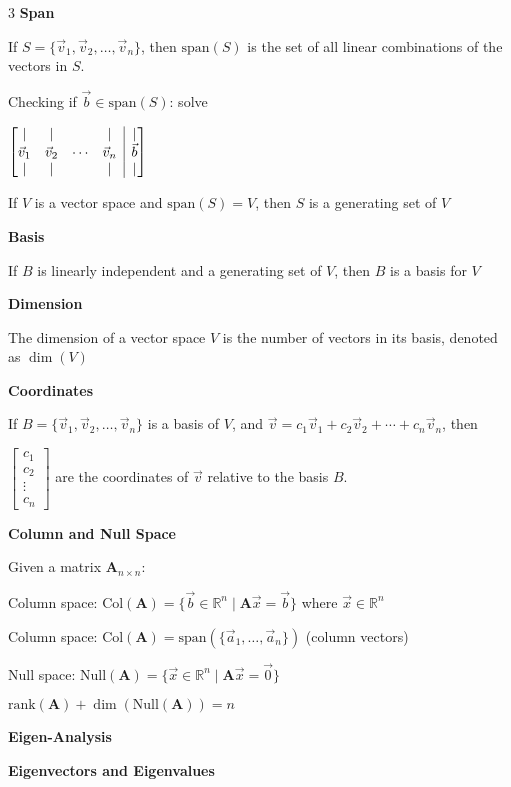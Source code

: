 \documentclass[10pt]{article}
\makeatletter
\newcommand{\R}{{\mathbb R}}
\newcommand{\rank}{\mathrm{rank}}
\newenvironment{amatrix}[1]{\left[\begin{array}{@{}*{#1}{c}|c@{}}}{\end{array}\right]}
\newcommand{\matr}[1]{\mathbf{#1}}
\newcommand\sectionheading[1]{\begin{center}\large{\textbf{#1}}\end{center}\normalsize}
\newcommand\heading[1]{\medskip\textbf{#1}\medskip}
\makeatother
\begin{document}
\begin{multicols*}{3}
\heading{Span}

If $S=\{\vec v_1, \vec v_2, \ldots, \vec v_n\}$, then $\mathrm{span}(S)$ is the set of all linear combinations of the vectors in $S$.

Checking if $\vec b\in\mathrm{span}(S)$: solve 

$\begin{amatrix}{4}
    \vert & \vert & & \vert & \vert \\
    \vec v_1 & \vec v_2 & \cdots & \vec v_n & \vec b \\
    \vert & \vert & & \vert & \vert 
\end{amatrix}$

If $V$ is a vector space and $\mathrm{span}(S)=V$, then $S$ is a generating set of $V$

\heading{Basis}

If $B$ is linearly independent and a generating set of $V$, then $B$ is a basis for $V$

\heading{Dimension}

The dimension of a vector space $V$ is the number of vectors in its basis, denoted as $\dim(V)$

\heading{Coordinates}

If $B=\{\vec v_1, \vec v_2, \ldots, \vec v_n\}$ is a basis of $V$, and $\vec v=c_1\vec v_1 + c_2\vec v_2 + \cdots + c_n\vec v_n$, then 

$\begin{bmatrix}
    c_1 \\
    c_2 \\
    \vdots \\
    c_n
\end{bmatrix}$ are the coordinates of $\vec v$ relative to the basis $B$.

\heading{Column and Null Space}

Given a matrix $\matr{A}_{n\times n}$:

Column space: $\mathrm{Col}(\matr{A})=\{\vec b\in\R^n\mid\matr{A}\vec x=\vec b\}$ where $\vec x\in\R^n$

Column space: $\mathrm{Col}(\matr{A})=\mathrm{span}(\{\vec a_1,\ldots,\vec a_n\})$ (column vectors)

Null space: $\mathrm{Null}(\matr{A})=\{\vec x\in\R^n\mid\matr{A}\vec x=\vec 0\}$

$\rank(\matr{A})+\dim(\mathrm{Null}(\matr{A}))=n$

\sectionheading{Eigen-Analysis}

\heading{Eigenvectors and Eigenvalues}


\end{multicols*}
\end{document}
